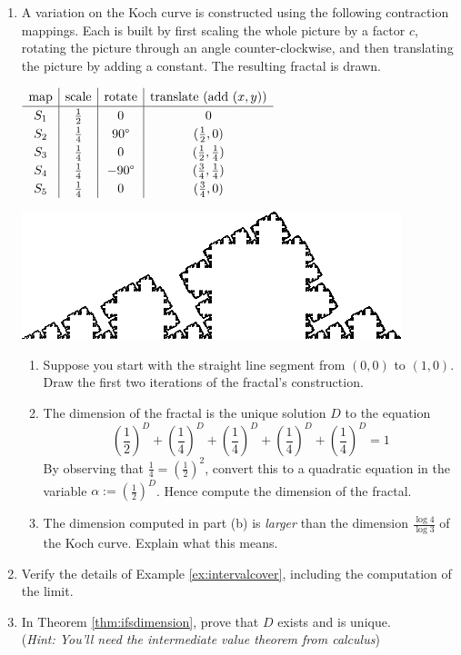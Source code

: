 \begin{exercises}
\begin{enumerate}
	\item A variation on the Koch curve is constructed using the following contraction mappings. Each is built by first scaling the whole picture by a factor $c$, rotating the picture through an angle counter-clockwise, and then translating the picture by adding a constant. The resulting fractal is drawn.\par  
  \begin{minipage}{0.52\linewidth}
  \qquad$\displaystyle\def\arraystretch{1.2}\begin{array}{c|c|c|c}
  \text{map}&\text{scale}&\text{rotate}&\text{translate (add $(x,y)$)}\\\hline
  S_1&\frac 12&0&0\\
  S_2&\frac 14&\ang{90}&(\frac 12,0)\\
  S_3&\frac 14&0&(\frac 12,\frac 14)\\
  S_4&\frac 14&-\ang{90}&(\frac 34,\frac 14)\\
  S_5&\frac 14&0&(\frac 34,0)\\
  \end{array}$
  \end{minipage}\begin{minipage}{0.48\linewidth}
  \flushright \includegraphics{fractal}
  \end{minipage}\par
  \begin{enumerate}
    \item Suppose you start with the straight line segment from $(0,0)$ to $(1,0)$. Draw the first two iterations of the fractal's construction.
    \item The dimension of the fractal is the unique solution $D$ to the equation
    \[\left(\frac 12\right)^D+\left(\frac 14\right)^D+\left(\frac 14\right)^D+\left(\frac 14\right)^D+\left(\frac 14\right)^D=1\]
    By observing that $\frac 14=\left(\frac 12\right)^2$, convert this to a quadratic equation in the variable $\alpha:=\left(\frac 12\right)^D$. Hence compute the dimension of the fractal.
       \item The dimension computed in part (b) is \emph{larger} than the dimension $\frac{\log 4}{\log 3}$ of the Koch curve. Explain what this means.
  \end{enumerate}


	\item Verify the details of Example \ref{ex:intervalcover}, including the computation of the limit.

	\item In Theorem \ref{thm:ifsdimension}, prove that $D$ exists and is unique.\\
	(\emph{Hint: You'll need the intermediate value theorem from calculus})
	
\end{enumerate}
\end{exercises}